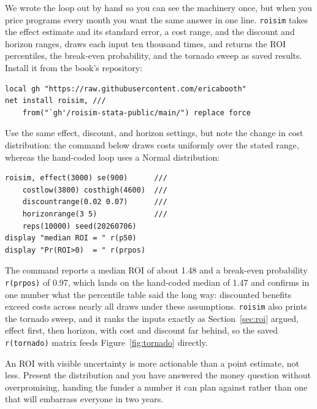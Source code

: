 \documentclass[
    a4paper,
    fontsize=10pt,
    twoside=true,
    numbers=noenddot,
]{kaobook}
\begin{document}
\begin{kaobox}[frametitle=Package Integration: \texttt{roisim}]
We wrote the loop out by hand so you can see the machinery once, but when you price programs every month you want the same answer in one line. \texttt{roisim} takes the effect estimate and its standard error, a cost range, and the discount and horizon ranges, draws each input ten thousand times, and returns the ROI percentiles, the break-even probability, and the tornado sweep as saved results. Install it from the book's repository:
\par
{\footnotesize
\begin{verbatim}
local gh "https://raw.githubusercontent.com/ericabooth"
net install roisim, ///
    from("`gh'/roisim-stata-public/main/") replace force
\end{verbatim}
}
Use the same effect, discount, and horizon settings, but note the change in cost distribution: the command below draws costs uniformly over the stated range, whereas the hand-coded loop uses a Normal distribution:
\par
{\footnotesize
\begin{verbatim}
roisim, effect(3000) se(900)      ///
    costlow(3800) costhigh(4600)  ///
    discountrange(0.02 0.07)      ///
    horizonrange(3 5)             ///
    reps(10000) seed(20260706)
display "median ROI = " r(p50)
display "Pr(ROI>0)  = " r(prpos)
\end{verbatim}
}
The command reports a median ROI of about 1.48 and a break-even probability \texttt{r(prpos)} of 0.97, which lands on the hand-coded median of 1.47 and confirms in one number what the percentile table said the long way: discounted benefits exceed costs across nearly all draws under these assumptions. \texttt{roisim} also prints the tornado sweep, and it ranks the inputs exactly as Section~\ref{sec:roi} argued, effect first, then horizon, with cost and discount far behind, so the saved \texttt{r(tornado)} matrix feeds Figure~\ref{fig:tornado} directly.
\end{kaobox}

An ROI with visible uncertainty is more actionable than a point estimate, not less. Present the distribution and you have answered the money question without overpromising, handing the funder a number it can plan against rather than one that will embarrass everyone in two years.
\end{document}
